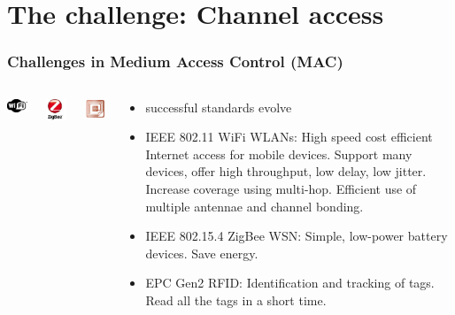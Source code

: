 \documentclass{beamer}
\begin{document}
\section{The challenge: Channel access}
\begin{frame}
  \frametitle{Challenges in Medium Access Control (MAC)}
  \begin{columns}[t]
      \begin{center}
        \includegraphics[width=1.0in]{figures/wifi}
      \end{center}
      \begin{center}
        \includegraphics[width=1.0in]{figures/zigbee}
      \end{center}
      \begin{center}
        \includegraphics[width=1.0in]{figures/rfid}
      \end{center}
      \begin{block}{}
        \begin{itemize}
          \item successful standards evolve
          \item IEEE 802.11 WiFi WLANs: High speed cost efficient Internet access for mobile devices. Support many devices, offer high throughput, low delay, low jitter. Increase coverage using multi-hop. Efficient use of multiple antennae and channel bonding.
          \item IEEE 802.15.4 ZigBee WSN: Simple, low-power battery devices. Save energy.
          \item EPC Gen2 RFID: Identification and tracking of tags. Read all the tags in a short time.
        \end{itemize}
      \end{block}
  \end{columns}
\end{frame}
\end{document}
